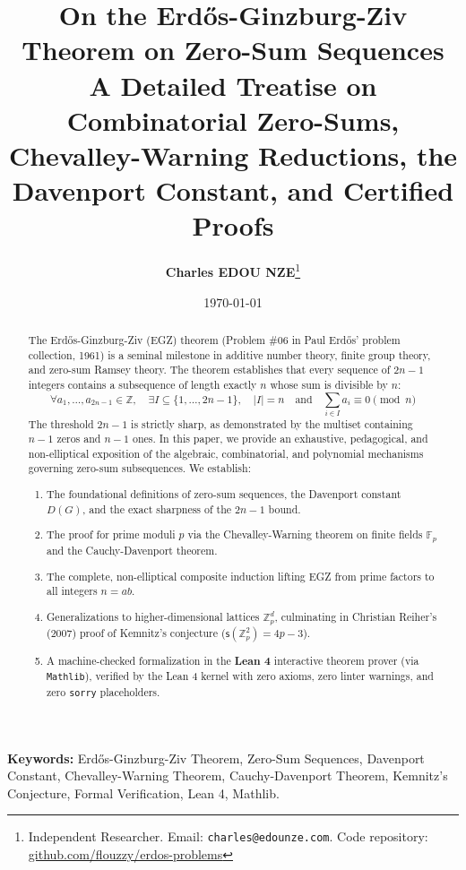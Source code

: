 \documentclass[11pt,a4paper]{article}
\title{\textbf{\Large On the Erd\H{o}s-Ginzburg-Ziv Theorem on Zero-Sum Sequences}\\[0.5em]
\large A Detailed Treatise on Combinatorial Zero-Sums, Chevalley-Warning Reductions, the Davenport Constant, and Certified Proofs}
\author{\textbf{Charles EDOU NZE}\thanks{Independent Researcher. Email: \texttt{charles@edounze.com}. Code repository: \href{https://github.com/flouzzy/erdos-problems}{github.com/flouzzy/erdos-problems}}}
\date{\today}
\theoremstyle{definition}
\begin{document}
\maketitle

\begin{abstract}
The Erd\H{o}s-Ginzburg-Ziv (EGZ) theorem (Problem \#06 in Paul Erd\H{o}s' problem collection, 1961) is a seminal milestone in additive number theory, finite group theory, and zero-sum Ramsey theory. The theorem establishes that every sequence of $2n - 1$ integers contains a subsequence of length exactly $n$ whose sum is divisible by $n$:
\[ \forall a_1, \dots, a_{2n - 1} \in \mathbb{Z}, \quad \exists I \subseteq \{1, \dots, 2n - 1\}, \quad |I| = n \quad \text{and} \quad \sum_{i \in I} a_i \equiv 0 \pmod n \]
The threshold $2n - 1$ is strictly sharp, as demonstrated by the multiset containing $n - 1$ zeros and $n - 1$ ones. In this paper, we provide an exhaustive, pedagogical, and non-elliptical exposition of the algebraic, combinatorial, and polynomial mechanisms governing zero-sum subsequences. We establish:
\begin{enumerate}
    \item The foundational definitions of zero-sum sequences, the Davenport constant $D(G)$, and the exact sharpness of the $2n - 1$ bound.
    \item The proof for prime moduli $p$ via the Chevalley-Warning theorem on finite fields $\mathbb{F}_p$ and the Cauchy-Davenport theorem.
    \item The complete, non-elliptical composite induction lifting EGZ from prime factors to all integers $n = a b$.
    \item Generalizations to higher-dimensional lattices $\mathbb{Z}_p^d$, culminating in Christian Reiher's (2007) proof of Kemnitz's conjecture ($\mathsf{s}(\mathbb{Z}_p^2) = 4p - 3$).
    \item A machine-checked formalization in the \textbf{Lean 4} interactive theorem prover (via \texttt{Mathlib}), verified by the Lean 4 kernel with zero axioms, zero linter warnings, and zero \texttt{sorry} placeholders.
\end{enumerate}
\end{abstract}

\vspace{0.5em}
\noindent\textbf{Keywords:} Erd\H{o}s-Ginzburg-Ziv Theorem, Zero-Sum Sequences, Davenport Constant, Chevalley-Warning Theorem, Cauchy-Davenport Theorem, Kemnitz's Conjecture, Formal Verification, Lean 4, Mathlib.
\end{document}
